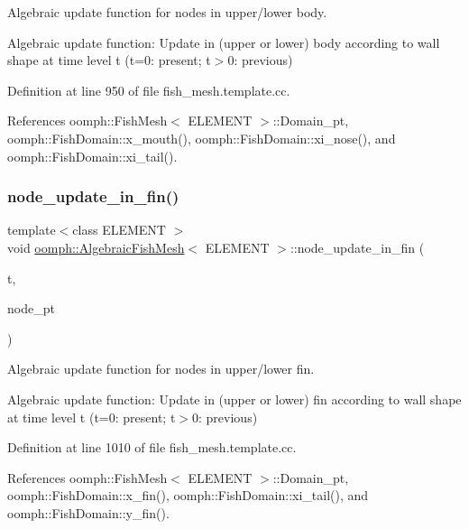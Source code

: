 Algebraic update function for nodes in upper/lower body. 

Algebraic update function\+: Update in (upper or lower) body according to wall shape at time level t (t=0\+: present; t$>$0\+: previous) 

Definition at line 950 of file fish\+\_\+mesh.\+template.\+cc.



References oomph\+::\+Fish\+Mesh$<$ E\+L\+E\+M\+E\+N\+T $>$\+::\+Domain\+\_\+pt, oomph\+::\+Fish\+Domain\+::x\+\_\+mouth(), oomph\+::\+Fish\+Domain\+::xi\+\_\+nose(), and oomph\+::\+Fish\+Domain\+::xi\+\_\+tail().

\mbox{\label{classoomph_1_1AlgebraicFishMesh_ad4a6f95e21e3d81b9defde90636e7d45}} 
\subsubsection{\texorpdfstring{node\+\_\+update\+\_\+in\+\_\+fin()}{node\_update\_in\_fin()}}
{\footnotesize\ttfamily template$<$class E\+L\+E\+M\+E\+NT $>$ \\
void \hyperlink{classoomph_1_1AlgebraicFishMesh}{oomph\+::\+Algebraic\+Fish\+Mesh}$<$ E\+L\+E\+M\+E\+NT $>$\+::node\+\_\+update\+\_\+in\+\_\+fin (\begin{DoxyParamCaption}\item[{const unsigned \&}]{t,  }\item[{Algebraic\+Node $\ast$\&}]{node\+\_\+pt }\end{DoxyParamCaption})\hspace{0.3cm}{\ttfamily [protected]}}



Algebraic update function for nodes in upper/lower fin. 

Algebraic update function\+: Update in (upper or lower) fin according to wall shape at time level t (t=0\+: present; t$>$0\+: previous) 

Definition at line 1010 of file fish\+\_\+mesh.\+template.\+cc.



References oomph\+::\+Fish\+Mesh$<$ E\+L\+E\+M\+E\+N\+T $>$\+::\+Domain\+\_\+pt, oomph\+::\+Fish\+Domain\+::x\+\_\+fin(), oomph\+::\+Fish\+Domain\+::xi\+\_\+tail(), and oomph\+::\+Fish\+Domain\+::y\+\_\+fin().

